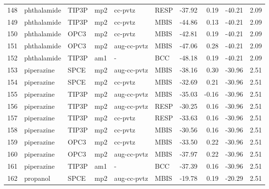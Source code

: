 \begin{tabular}{llllllrrrr}
148 &                    phthalamide &      TIP3P &      mp2 &      cc-pvtz &         RESP & -37.92 &      0.19 &      -40.21 &     2.09 \\
149 &                    phthalamide &      TIP3P &      mp2 &      cc-pvtz &         MBIS & -44.86 &      0.13 &      -40.21 &     2.09 \\
150 &                    phthalamide &       OPC3 &      mp2 &      cc-pvtz &         MBIS & -42.81 &      0.19 &      -40.21 &     2.09 \\
151 &                    phthalamide &       OPC3 &      mp2 &  aug-cc-pvtz &         MBIS & -47.06 &      0.28 &      -40.21 &     2.09 \\
152 &                    phthalamide &      TIP3P &      am1 &            - &          BCC & -48.18 &      0.19 &      -40.21 &     2.09 \\
153 &                     piperazine &       SPCE &      mp2 &  aug-cc-pvtz &         MBIS & -38.16 &      0.30 &      -30.96 &     2.51 \\
154 &                     piperazine &       SPCE &      mp2 &      cc-pvtz &         MBIS & -32.69 &      0.21 &      -30.96 &     2.51 \\
155 &                     piperazine &      TIP3P &      mp2 &  aug-cc-pvtz &         MBIS & -35.03 &     -0.16 &      -30.96 &     2.51 \\
156 &                     piperazine &      TIP3P &      mp2 &  aug-cc-pvtz &         RESP & -30.25 &      0.16 &      -30.96 &     2.51 \\
157 &                     piperazine &      TIP3P &      mp2 &      cc-pvtz &         RESP & -33.63 &      0.16 &      -30.96 &     2.51 \\
158 &                     piperazine &      TIP3P &      mp2 &      cc-pvtz &         MBIS & -30.56 &      0.16 &      -30.96 &     2.51 \\
159 &                     piperazine &       OPC3 &      mp2 &      cc-pvtz &         MBIS & -33.50 &      0.22 &      -30.96 &     2.51 \\
160 &                     piperazine &       OPC3 &      mp2 &  aug-cc-pvtz &         MBIS & -37.97 &      0.22 &      -30.96 &     2.51 \\
161 &                     piperazine &      TIP3P &      am1 &            - &          BCC & -37.39 &      0.16 &      -30.96 &     2.51 \\
162 &                       propanol &       SPCE &      mp2 &  aug-cc-pvtz &         MBIS & -19.78 &      0.19 &      -20.29 &     2.51 \\

\end{tabular}
